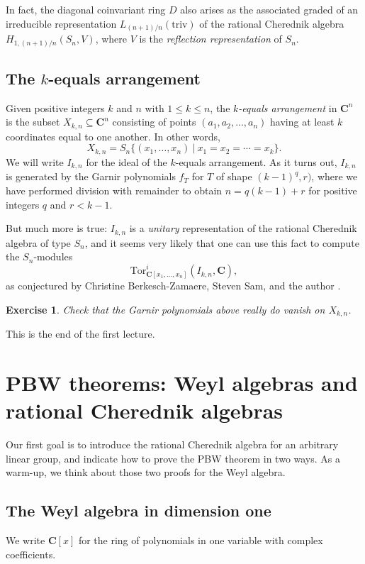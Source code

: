\documentclass[12pt, reqno]{amsart}
\numberwithin{equation}{section}
\theoremstyle{definition}
\theoremstyle{plain}
\newtheorem{exercise}{Exercise}
\newcommand{\CC}{\mathbf{C}}
\begin{document}
In fact, the diagonal coinvariant ring $D$ also arises as the associated graded of an irreducible representation $L_{(n+1)/n}(\mathrm{triv})$ of the rational Cherednik algebra $H_{1,(n+1)/n}(S_n,V)$, where $V$ is the \emph{reflection representation} of $S_n$.

\subsection{The $k$-equals arrangement} Given positive integers $k$ and $n$ with $1 \leq k \leq n$, the \emph{$k$-equals arrangement} in $\CC^n$ is the subset $X_{k,n} \subseteq \CC^n$ consisting of points $(a_1,a_2,\dots,a_n)$ having at least $k$ coordinates equal to one another. In other words,
$$X_{k,n}=S_n \{(x_1,\dots,x_n) \ | \ x_1=x_2=\cdots=x_k \}.$$ We will write $I_{k,n}$ for the ideal of the $k$-equals arrangement. As it turns out, $I_{k,n}$ is generated by the Garnir polynomials $f_T$ for $T$ of shape $(k-1)^q,r)$, where we have performed division with remainder to obtain $n=q(k-1)+r$ for positive integers $q$ and $r<k-1$.

But much more is true: $I_{k,n}$ is a \emph{unitary} representation of the rational Cherednik algebra of type $S_n$, and it seems very likely that one can use this fact to compute the $S_n$-modules $$\mathrm{Tor}^i_{\CC[x_1,\dots,x_n]}(I_{k,n},\CC),$$ as conjectured by Christine Berkesch-Zamaere, Steven Sam, and the author \cite{BGS}.

\begin{exercise}
Check that the Garnir polynomials above really do vanish on $X_{k,n}$.
\end{exercise}

This is the end of the first lecture.

\section{PBW theorems: Weyl algebras and rational Cherednik algebras}

Our first goal is to introduce the rational Cherednik algebra for an arbitrary linear group, and indicate how to prove the PBW theorem in two ways. As a warm-up, we think about those two proofs for the Weyl algebra. 

\subsection{The Weyl algebra in dimension one} We write $\CC[x]$ for the ring of polynomials in one variable with complex coefficients. 
\end{document}
